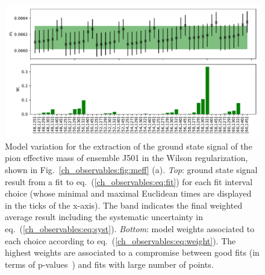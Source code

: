 \begin{figure}
\centering
	\includegraphics[width=1.\textwidth]{./cap3/figs/meff_ma_J501.pdf}
    \caption{Model variation for the extraction of the ground state signal of the pion effective mass of ensemble J501 in the Wilson regularization, shown in Fig.~\ref{ch_observables:fig:meff} (a). {\it Top}: ground state signal result from a fit to eq.~(\ref{ch_observables:eq:fit}) for each fit interval choice (whose minimal and maximal Euclidean times are displayed in the ticks of the x-axis). The band indicates the final weighted average result including the systematic uncertainty in eq.~(\ref{ch_observables:eq:syst}). {\it Bottom}: model weights associated to each choice according to eq.~(\ref{ch_observables:eq:weight}). The highest weights are associated to a compromise between good fits (in terms of p-values~\citep{Bruno:2022mfy}) and fits with large number of points.}
    \label{ch_observables:fig:model_av}
\end{figure}




